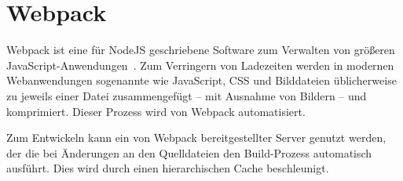 \section{Webpack}
\label{sec:g_webpack}

Webpack ist eine für NodeJS geschriebene Software zum Verwalten von größeren
JavaScript-Anwendungen~\cite{webpack}.  Zum Verringern von Ladezeiten werden in
modernen Webanwendungen sogenannte  wie JavaScript,
CSS und Bilddateien üblicherweise zu jeweils einer Datei zusammengefügt -- mit
Ausnahme von Bildern -- und komprimiert.  Dieser Prozess wird von Webpack
automatisiert.

Zum Entwickeln kann ein von Webpack bereitgestellter Server genutzt werden, der
die bei Änderungen an den Quelldateien den Build-Prozess automatisch ausführt.
Dies wird durch einen hierarchischen Cache beschleunigt.



